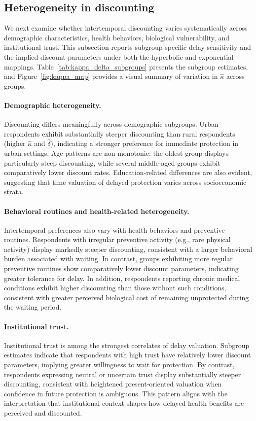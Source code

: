 \documentclass[doublespacing]{utdthesis}
\begin{document}
\subsection{Heterogeneity in discounting}
\label{subsec:heterogeneity}



We next examine whether intertemporal discounting varies systematically across demographic characteristics, health behaviors, biological vulnerability, and institutional trust. This subsection reports subgroup-specific delay sensitivity and the implied discount parameters under both the hyperbolic and exponential mappings. Table~\ref{tab:kappa_delta_subgroups} presents the subgroup estimates, and Figure~\ref{fig:kappa_map} provides a visual summary of variation in $\hat{\kappa}$ across groups.


\paragraph{Demographic heterogeneity.}
Discounting differs meaningfully across demographic subgroups. Urban respondents exhibit substantially steeper discounting than rural respondents (higher $\hat{\kappa}$ and $\hat{\delta}$), indicating a stronger preference for immediate protection in urban settings. Age patterns are non-monotonic: the oldest group displays particularly steep discounting, while several middle-aged groups exhibit comparatively lower discount rates. Education-related differences are also evident, suggesting that time valuation of delayed protection varies across socioeconomic strata.

\paragraph{Behavioral routines and health-related heterogeneity.}
Intertemporal preferences also vary with health behaviors and preventive routines. Respondents with irregular preventive activity (e.g., rare physical activity) display markedly steeper discounting, consistent with a larger behavioral burden associated with waiting. In contrast, groups exhibiting more regular preventive routines show comparatively lower discount parameters, indicating greater tolerance for delay. In addition, respondents reporting chronic medical conditions exhibit higher discounting than those without such conditions, consistent with greater perceived biological cost of remaining unprotected during the waiting period.

\paragraph{Institutional trust.}
Institutional trust is among the strongest correlates of delay valuation. Subgroup estimates indicate that respondents with high trust have relatively lower discount parameters, implying greater willingness to wait for protection. By contrast, respondents expressing neutral or uncertain trust display substantially steeper discounting, consistent with heightened present-oriented valuation when confidence in future protection is ambiguous. This pattern aligns with the interpretation that institutional context shapes how delayed health benefits are perceived and discounted.
\end{document}
